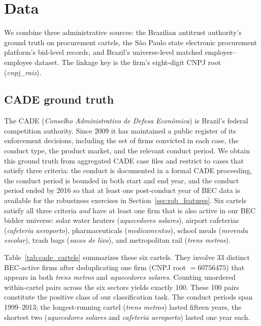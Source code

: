 \section{Data}\label{sec:data}

We combine three administrative sources: the Brazilian antitrust authority's ground truth on procurement cartels, the S\~{a}o Paulo state electronic procurement platform's bid-level records, and Brazil's universe-level matched employer--employee dataset. The linkage key is the firm's eight-digit CNPJ root (\emph{cnpj\_raiz}).

\subsection{CADE ground truth}\label{sec:data_cade}

The CADE (\emph{Conselho Administrativo de Defesa Econ\^{o}mica}) is Brazil's federal competition authority. Since 2009 it has maintained a public register of its enforcement decisions, including the set of firms convicted in each case, the conduct type, the product market, and the relevant conduct period. We obtain this ground truth from aggregated CADE case files and restrict to cases that satisfy three criteria: the conduct is documented in a formal CADE proceeding, the conduct period is bounded in both start and end year, and the conduct period ended by 2016 so that at least one post-conduct year of BEC data is available for the robustness exercises in Section~\ref{sec:rob_features}. Six cartels satisfy all three criteria \emph{and} have at least one firm that is also active in our BEC bidder universe: solar water heaters (\emph{aquecedores solares}), airport cafeterias (\emph{cafeteria aeroporto}), pharmaceuticals (\emph{medicamentos}), school meals (\emph{merenda escolar}), trash bags (\emph{sacos de lixo}), and metropolitan rail (\emph{trens metros}).

Table~\ref{tab:cade_cartels} summarizes these six cartels. They involve 33 distinct BEC-active firms after deduplicating one firm (CNPJ root $= 60756475$) that appears in both \emph{trens metros} and \emph{aquecedores solares}. Counting unordered within-cartel pairs across the six sectors yields exactly 100. These 100 pairs constitute the positive class of our classification task. The conduct periods span 1999--2013; the longest-running cartel (\emph{trens metros}) lasted fifteen years, the shortest two (\emph{aquecedores solares} and \emph{cafeteria aeroporto}) lasted one year each.

